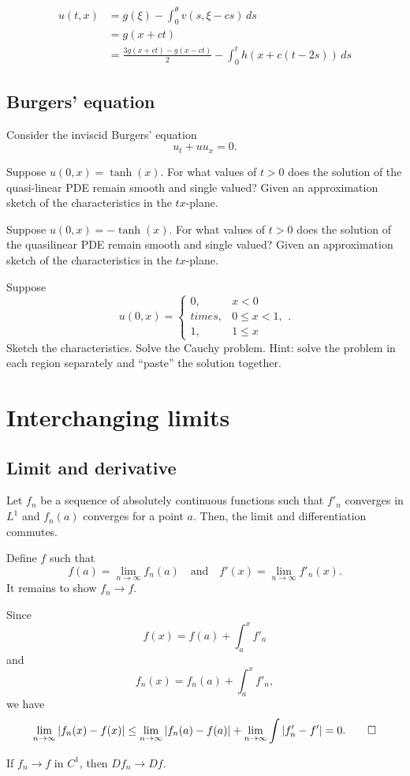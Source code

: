 \documentclass[12pt]{article}
\begin{document}
\begin{align*}
u(t,x)&=g(\xi)-\int_0^\theta v(s,\xi-cs)\,ds\\
&=g(x+ct)\\
&=\frac{3g(x+ct)-g(x-ct)}2-\int_0^th(x+c(t-2s))\,ds
\end{align*}



\clearpage
\subsection{Burgers' equation}

Consider the inviscid Burgers' equation
\[u_t+uu_x=0.\]
\begin{parts}
\item Suppose $u(0,x)=\tanh(x)$. For what values of $t>0$ does the solution of the quasi-linear PDE remain smooth and single valued? Given an approximation sketch of the characteristics in the $tx$-plane.
\item Suppose $u(0,x)=-\tanh(x)$. For what values of $t>0$ does the solution of the quasilinear PDE remain smooth and single valued? Given an approximation sketch of the characteristics in the $tx$-plane.
\item Suppose
\[u(0,x)=\begin{cases}0,&x<0\\times,&0\le x<1,\\1,&1\le x\end{cases}.\]
Sketch the characteristics. Solve the Cauchy problem. Hint: solve the problem in each region separately and ``paste'' the solution together.
\end{parts}











\section{Interchanging limits}

\subsection{Limit and derivative}
\begin{thm}
Let $f_n$ be a sequence of absolutely continuous functions such that $f'_n$ converges in $L^1$ and $f_n(a)$ converges for a point $a$.
Then, the limit and differentiation commutes.
\end{thm}
\begin{pf}
Define $f$ such that
\[f(a)=\lim_{n\to\infty}f_n(a)\quad\text{and}\quad f'(x)=\lim_{n\to\infty}f'_n(x).\]
It remains to show $f_n\to f$.

Since
\[f(x)=f(a)+\int_a^xf'_n\]
and
\[f_n(x)=f_n(a)+\int_a^xf'_n,\]
we have
\[\lim_{n\to\infty}|f_n(x)-f(x)|\le\lim_{n\to\infty}|f_n(a)-f(a)|+\lim_{n\to\infty}\int|f_n'-f'|=0.\qedhere\]
\end{pf}
\begin{cor}
If $f_n\to f$ in $C^1$, then $Df_n\to Df$.
\end{cor}
\end{document}

